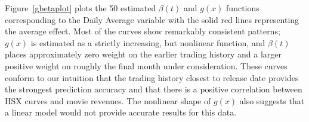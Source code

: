 \documentclass[aos,MSNbibl,dvips]{arximspdf}
\begin{document}



Figure~\ref{gbetaplot} plots the 50 estimated $\beta(t)$ and $g(x)$
functions corresponding to the Daily Average variable with the solid
red lines representing the average effect. Most of the curves show
remarkably consistent patterns; $g(x)$ is estimated as a strictly
increasing, but nonlinear function, and $\beta(t)$ places
approximately zero weight on the earlier trading history and a larger
positive weight on roughly the final month under consideration. These
curves conform to our intuition that the trading history closest to
release date provides the strongest prediction accuracy and that there
is a positive correlation between HSX curves and movie revenues. The
nonlinear shape of $g(x)$ also suggests that a linear model would not
provide accurate results for this data.

\end{document}
